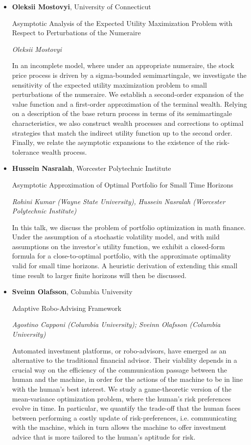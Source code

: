 \begin{itemize}
\item \textbf{Oleksii Mostovyi}, University of Connecticut

Asymptotic Analysis of the Expected Utility Maximization Problem with Respect to Perturbations of the Numeraire

\emph{\footnotesize Oleksii Mostovyi}

In an incomplete model, where under an appropriate numeraire, the stock price process is driven by a sigma-bounded semimartingale, we investigate the sensitivity of the expected utility maximization problem to small perturbations of the numeraire. We establish a second-order expansion of the value function and a first-order approximation of the terminal wealth. Relying on a description of the base return process in terms of its semimartingale characteristics, we also construct wealth processes and corrections to optimal strategies that match the indirect utility function up to the second order. Finally, we relate the asymptotic expansions to the existence of the risk-tolerance wealth process.

\item \textbf{Hussein Nasralah}, Worcester Polytechnic Institute

Asymptotic Approximation of Optimal Portfolio for Small Time Horizons

\emph{\footnotesize Rohini Kumar (Wayne State University), Hussein Nasralah (Worcester Polytechnic Institute)}

In this talk, we discuss the problem of portfolio optimization in math finance.  Under the assumption of a stochastic volatility model, and with mild assumptions on the investor's utility function, we exhibit a closed-form formula for a close-to-optimal portfolio, with the approximate optimality valid for small time horizons.  A heuristic derivation of extending this small time result to larger finite horizons will then be discussed.

\item \textbf{Sveinn Olafsson}, Columbia University

Adaptive Robo-Advising Framework

\emph{\footnotesize Agostino Capponi (Columbia University); Sveinn Olafsson (Columbia University)}

Automated investment platforms, or robo-advisors, have emerged as an alternative to the traditional financial advisor. Their viability depends in a crucial way on the efficiency of the communication passage between the human and the machine, in order for the actions of the machine to be in line with the human's best interest. We study a game-theoretic version of the mean-variance optimization problem, where the human's risk preferences evolve in time. In particular, we quantify the trade-off that the human faces between performing a costly update of risk-preferences, i.e. communicating with the machine, which in turn allows the machine to offer investment advice that is more tailored to the human's aptitude for risk.


\end{itemize}
